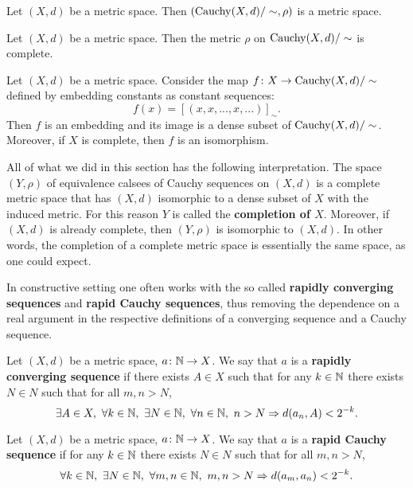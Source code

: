\begin{proposition}
  Let $(X, d)$ be a metric space.
  Then $(\mathop{\rm Cauchy}\nolimits(X, d) / \sim, \rho)$ is a metric space.
\end{proposition}
\begin{proposition}
  Let $(X, d)$ be a metric space.
  Then the metric $\rho$ on $\mathop{\rm Cauchy}\nolimits(X, d) / \sim$ is complete.
\end{proposition}
\begin{proposition}
  Let $(X, d)$ be a metric space.
  Consider the map
  $f \colon X \to \mathop{\rm Cauchy}\nolimits(X, d) / \sim$ defined by embedding constants
  as constant sequences:
  \begin{equation}
    f(x) = [(x, x, ..., x, ...)]_\sim.
  \end{equation}
  Then $f$ is an embedding and its image is a dense subset of
  $\mathop{\rm Cauchy}\nolimits(X, d) / \sim$.
  Moreover, if $X$ is complete, then $f$ is an isomorphism.
\end{proposition}
\begin{remark}
  All of what we did in this section has the following interpretation.
  The space $(Y, \rho)$ of equivalence calsees of Cauchy sequences on $(X, d)$
  is a complete metric space that has $(X, d)$
  isomorphic to a dense subset of $X$ with the induced metric.
  For this reason $Y$ is called the \textbf{completion of $X$}.
  Moreover, if $(X, d)$ is already complete, then $(Y, \rho)$ is isomorphic to
  $(X, d)$.
  In other words, the completion of a complete metric space is essentially the
  same space, as one could expect.
\end{remark}
\begin{remark}
  In constructive setting one often works with the so called
  \textbf{rapidly converging sequences} and \textbf{rapid Cauchy sequences},
  thus removing the dependence on a real argument in the respective definitions
  of a converging sequence and a Cauchy sequence.
\end{remark}
\begin{definition}
  Let $(X, d)$ be a metric space, $a \colon \mathbb{N} \to X$.
  We say that $a$ is a \textbf{rapidly converging sequence} if
  there exists $A \in X$ such that for any $k \in \mathbb{N}$ there exists $N \in N$
  such that for all $m, n > N$,
  \begin{equation}
    \exists A \in X,\
      \forall k \in \mathbb{N},\
        \exists N \in \mathbb{N},\
          \forall n \in \mathbb{N},\
             n > N \Rightarrow d(a_n, A) < 2^{-k}.
  \end{equation}
\end{definition}
\begin{definition}
  Let $(X, d)$ be a metric space, $a \colon \mathbb{N} \to X$.
  We say that $a$ is a \textbf{rapid Cauchy sequence} if
  for any $k \in \mathbb{N}$ there exists $N \in N$ such that for all $m, n > N$,
  \begin{equation}
    \forall k \in \mathbb{N},\
      \exists N \in \mathbb{N},\
        \forall m, n \in \mathbb{N},\
           m, n > N \Rightarrow d(a_m, a_n) < 2^{-k}.
  \end{equation}
\end{definition}
